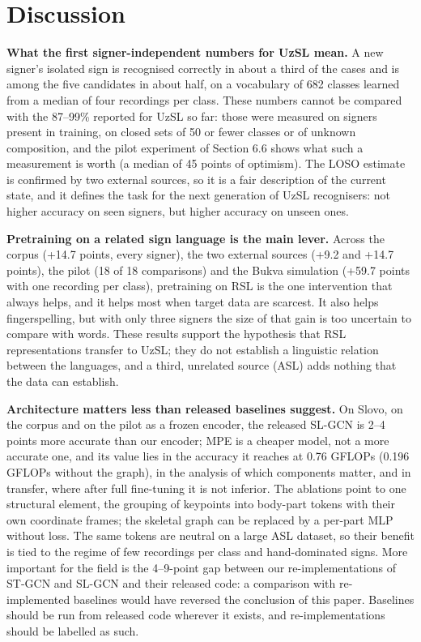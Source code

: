\documentclass[a4paper,fleqn]{cas-dc}
\begin{document}
\hypertarget{discussion}{%
\section{Discussion}\label{discussion}}

\textbf{What the first signer-independent numbers for UzSL mean.} A new signer's isolated sign is recognised correctly in about a third of the cases and is among the five candidates in about half, on a vocabulary of 682 classes learned from a median of four recordings per class. These numbers cannot be compared with the 87--99\% reported for UzSL so far: those were measured on signers present in training, on closed sets of 50 or fewer classes or of unknown composition, and the pilot experiment of Section 6.6 shows what such a measurement is worth (a median of 45 points of optimism). The LOSO estimate is confirmed by two external sources, so it is a fair description of the current state, and it defines the task for the next generation of UzSL recognisers: not higher accuracy on seen signers, but higher accuracy on unseen ones.

\textbf{Pretraining on a related sign language is the main lever.} Across the corpus (+14.7 points, every signer), the two external sources (+9.2 and +14.7 points), the pilot (18 of 18 comparisons) and the Bukva simulation (+59.7 points with one recording per class), pretraining on RSL is the one intervention that always helps, and it helps most when target data are scarcest. It also helps fingerspelling, but with only three signers the size of that gain is too uncertain to compare with words. These results support the hypothesis that RSL representations transfer to UzSL; they do not establish a linguistic relation between the languages, and a third, unrelated source (ASL) adds nothing that the data can establish.

\textbf{Architecture matters less than released baselines suggest.} On Slovo, on the corpus and on the pilot as a frozen encoder, the released SL-GCN is 2--4 points more accurate than our encoder; MPE is a cheaper model, not a more accurate one, and its value lies in the accuracy it reaches at 0.76 GFLOPs (0.196 GFLOPs without the graph), in the analysis of which components matter, and in transfer, where after full fine-tuning it is not inferior. The ablations point to one structural element, the grouping of keypoints into body-part tokens with their own coordinate frames; the skeletal graph can be replaced by a per-part MLP without loss. The same tokens are neutral on a large ASL dataset, so their benefit is tied to the regime of few recordings per class and hand-dominated signs. More important for the field is the 4--9-point gap between our re-implementations of ST-GCN and SL-GCN and their released code: a comparison with re-implemented baselines would have reversed the conclusion of this paper. Baselines should be run from released code wherever it exists, and re-implementations should be labelled as such.
\end{document}
